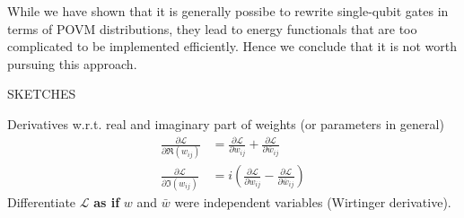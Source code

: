 \documentclass{article}
\begin{document}
While we have shown that it is generally possibe to rewrite single-qubit gates
in terms of POVM distributions, they lead to energy functionals that are too
complicated to be implemented efficiently. Hence we conclude that it is not
worth pursuing this approach.


SKETCHES

Derivatives w.r.t. real and imaginary part of weights (or parameters in general)
\begin{align}
    \frac{\partial \mathcal{L}}{\partial\Re(w_{ij})} &= \frac{\partial \mathcal{L}}{\partial w_{ij}} + \frac{\partial \mathcal{L}}{\partial \bar{w}_{ij}} \\
    \frac{\partial \mathcal{L}}{\partial\Im(w_{ij})} &= i\left(\frac{\partial \mathcal{L}}{\partial w_{ij}} - \frac{\partial \mathcal{L}}{\partial \bar{w}_{ij}}\right)
\end{align}
Differentiate $\mathcal{L}$ \textbf{as if} $w$ and $\bar{w}$ were independent variables (Wirtinger derivative).
\end{document}
